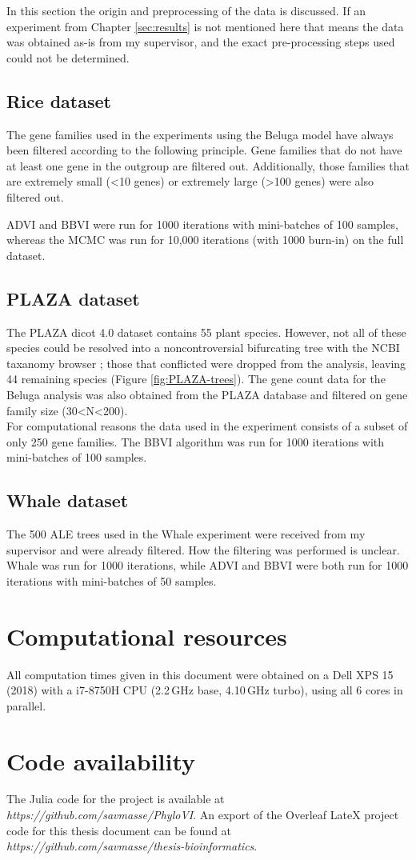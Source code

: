 In this section the origin and preprocessing of the data is discussed. If an experiment from Chapter \ref{sec:results} is not mentioned here that means the data was obtained as-is from my supervisor, and the exact pre-processing steps used could not be determined.


\subsection{Rice dataset}
\par
\medskip
\par The gene families used in the experiments using the Beluga model have always been filtered according to the following principle. Gene families that do not have at least one gene in the outgroup are filtered out. Additionally, those families that are extremely small (<10 genes) or extremely large (>100 genes) were also filtered out. 
\medskip
\par ADVI and BBVI were run for 1000 iterations with mini-batches of 100 samples, whereas the MCMC was run for 10,000 iterations (with 1000 burn-in) on the full dataset.

\subsection{PLAZA dataset}
The PLAZA dicot 4.0 dataset contains 55 plant species. However, not all of these species could be resolved into a noncontroversial bifurcating tree with the NCBI taxanomy browser \parencite{ncbi}; those that conflicted were dropped from the analysis, leaving 44 remaining species (Figure \ref{fig:PLAZA-trees}). The gene count data for the Beluga analysis was also obtained from the PLAZA database and filtered on gene family size (30<N<200).
\\ 
For computational reasons the data used in the experiment consists of a subset of only 250 gene families. The BBVI algorithm was run for 1000 iterations with mini-batches of 100 samples.

\subsection{Whale dataset}
The 500 ALE trees used in the Whale experiment were received from my supervisor and were already filtered. How the filtering was performed is unclear. Whale was run for 1000 iterations, while ADVI and BBVI were both run for 1000 iterations with mini-batches of 50 samples.


\section{Computational resources}
All computation times given in this document were obtained on a Dell XPS 15 (2018) with a i7-8750H CPU (2.2$\,$GHz base, 4.10$\,$GHz turbo), using all 6 cores in parallel. 

\section{Code availability}
The Julia code for the project is available at \textit{https://github.com/savmasse/PhyloVI}.  An export of the Overleaf LateX project code for this thesis document can be found at \\ \textit{https://github.com/savmasse/thesis-bioinformatics}.
